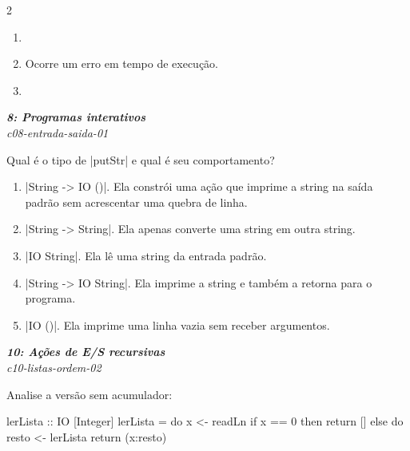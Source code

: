 \documentclass[a4paper,10pt,brazil]{article}
\begin{document}
\begin{multicols}{2}
\begin{enumerate}
  \item {}

  \item Ocorre um erro em tempo de execução.

  \item {}


\end{enumerate}

\begin{flushright}
  \footnotesize
  \textit{\textbf{8: Programas interativos}}\\
  \textit{c08-entrada-saida-01}\\

\end{flushright}
Qual é o tipo de \haskellinline|putStr| e qual é seu comportamento?

\begin{enumerate}
  \item \haskellinline|String -> IO ()|. Ela constrói uma ação que imprime a string na saída padrão sem acrescentar uma quebra de linha.

  \item \haskellinline|String -> String|. Ela apenas converte uma string em outra string.

  \item \haskellinline|IO String|. Ela lê uma string da entrada padrão.

  \item \haskellinline|String -> IO String|. Ela imprime a string e também a retorna para o programa.

  \item \haskellinline|IO ()|. Ela imprime uma linha vazia sem receber argumentos.


\end{enumerate}

\begin{flushright}
  \footnotesize
  \textit{\textbf{10: Ações de E/S recursivas}}\\
  \textit{c10-listas-ordem-02}\\

\end{flushright}
Analise a versão sem acumulador:

\begin{haskellcode}
lerLista :: IO [Integer]
lerLista = do
  x <- readLn
  if x == 0
    then return []
    else do
      resto <- lerLista
      return (x:resto)
\end{haskellcode}


\end{multicols}
\end{document}
